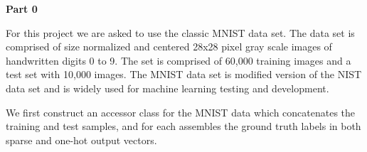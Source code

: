 \documentclass{article}
\begin{document}
\newpage	







\begin{center}
\textbf{Part 0 }
\end{center}

For this project we are asked to use the classic MNIST data set. The data set is comprised of size normalized and centered 28x28 pixel gray scale images of handwritten digits 0 to 9. The set is comprised of 60,000 training images and a test set with 10,000 images. The MNIST data set is modified version of the NIST data set and is widely used for machine learning testing and development. 

We first construct an accessor class for the MNIST data which concatenates the training and test samples, and for each assembles the ground truth labels in both sparse and one-hot output vectors.

\vspace{0.5cm}
\end{document}
